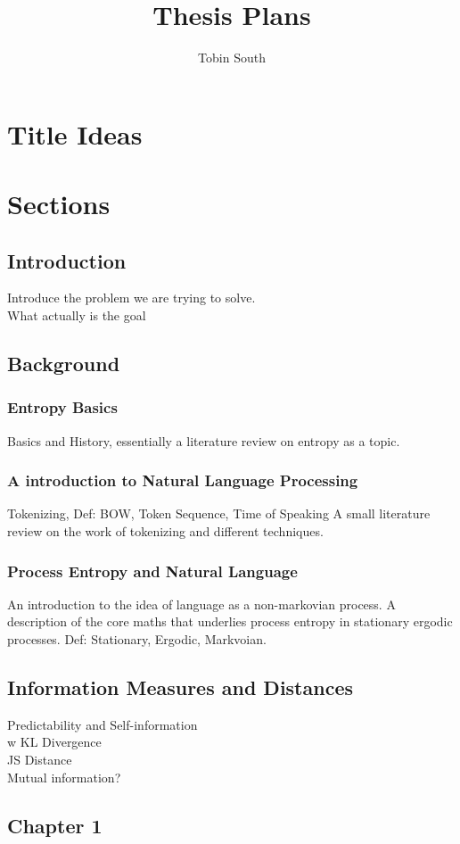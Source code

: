 \documentclass[12pt,a4paper]{article}
\title{Thesis Plans}
\author{Tobin South}
\begin{document}
\maketitle

\section{Title Ideas}

\section{Sections}
\subsection{Introduction}
Introduce the problem we are trying to solve. \\
What actually is the goal\\
\subsection{Background}
\subsubsection{Entropy Basics}
Basics and History, essentially a literature review on entropy as a topic.
\subsubsection{A introduction to Natural Language Processing}
Tokenizing, Def: BOW, Token Sequence, Time of Speaking
A small literature review on the work of tokenizing and different techniques.
\subsubsection{Process Entropy and Natural Language}
An introduction to the idea of language as a non-markovian process. A description of the core maths that underlies process entropy in stationary ergodic processes. Def: Stationary, Ergodic, Markvoian.
\subsection{Information Measures and Distances}
Predictability and Self-information\\w
KL Divergence \\
JS Distance \\
Mutual information?
\subsection{Chapter 1}
\end{document}

